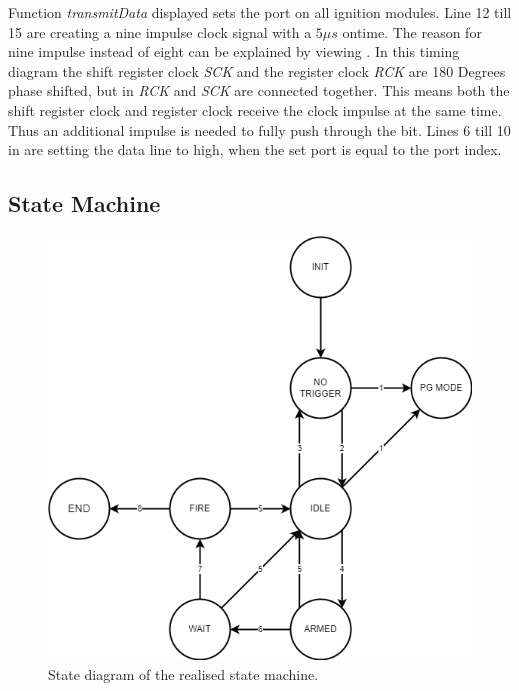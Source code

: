 \noindent Function \textit{transmitData} displayed  sets the port on all ignition modules. Line 12 till 15 are creating a nine impulse clock signal with a $5 \mu s$ ontime. The reason for nine impulse instead of eight can be explained by viewing . In this timing diagram the shift register clock \textit{SCK} and the register clock \textit{RCK} are 180 Degrees phase shifted, but in  \textit{RCK} and \textit{SCK} are connected together. This means both the shift register clock and register clock receive the clock impulse at the same time. Thus an additional impulse is needed to fully push through the bit. Lines 6 till 10 in  are setting the data line to high, when the set port is equal to the port index.


\pagebreak

\subsection{State Machine}
\begin{figure}[!ht]
    \centering
    \includegraphics[width=15cm]{./Figures/fsm.png}
    \caption{State diagram of the realised state machine.}
    \label{fig:state_machine}     
\end{figure}

